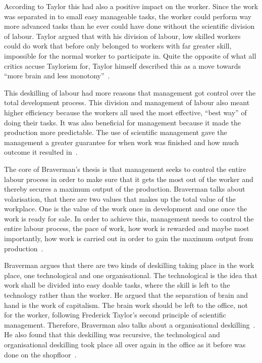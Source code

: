 \documentclass[a4paper,12pt,titlepage]{article}
\begin{document}
  According to Taylor this had also a positive impact on the worker.
  Since the work was separated in to small easy manageable tasks, the
  worker could perform way more advanced tasks than he ever could
  have done without the scientific division of labour. Taylor argued
  that with his division of labour, low skilled workers could
  do work that before only belonged to workers with far greater skill,
  impossible for the normal worker to participate in. Quite the opposite
  of what all critics accuse Taylorism for, Taylor himself described
  this as a move towards ``more brain and less monotony''~\cite[129]{hb}.

  This deskilling of labour had more reasons that management got control
  over the total development process. This division and management of
  labour also meant higher efficiency because the workers all used
  the most effective, ``best way'' of doing their tasks. It was also
  beneficial for management because it made the production more
  predictable. The use of scientific management gave the management
  a greater guarantee for when work was finished and how much outcome it
  resulted in~\cite[434]{ahdb}.

  The core of Braverman's thesis is that management seeks
  to control the entire labour process in order to make sure
  that it gets the most out of the worker and thereby secures
  a maximum output of the production. Braverman talks about
  volarisation, that there are two values that makes up the total
  value of the workplace. One is the value of the work once in
  development and one once the work is ready for sale. In order
  to achieve this, management needs to control the entire
  labour process, the pace of work, how work is rewarded and maybe
  most importantly, how work is carried out in order to
  gain the maximum output from production~\cite[151]{mnpb}.

  Braverman argues that there are two kinds of deskilling taking
  place in the work place,
  one technological and one organisational. The technological is the
  idea that work shall be divided into easy doable tasks, where the
  skill is left to the technology rather than the worker. He argued that
  the separation of brain and hand is the work of capitalism. The brain
  work should be left to the office, not for the worker, following
  Frederick Taylor's second principle of scientific management.
  Therefore, Braverman also talks about a organisational deskilling~\cite[113]{hb}.
  He also found that this deskilling was recursive, the
  technological and organisational deskilling took place all
  over again in the office as it before was done
  on the shopfloor~\cite[316]{hb}.
\end{document}
